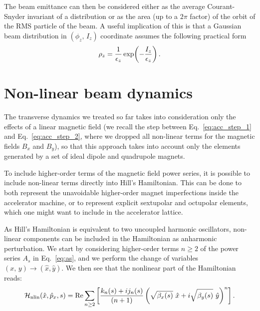 The beam emittance can then be considered either as the average Courant-Snyder invariant of a distribution or as the area (up to a $2\pi$ factor) of the orbit of the RMS particle of the beam. A useful implication of this is that a Gaussian beam distribution in $(\phi_z,\,I_z)$ coordinate assumes the following practical form
%
\begin{equation}
\rho_z = \frac{1}{\epsilon_z}\exp(-\frac{I_z}{\epsilon_z})\,.
\end{equation}
%

\section{Non-linear beam dynamics}\label{sec:non-linear}

The transverse dynamics we treated so far takes into consideration only the effects of a linear magnetic field (we recall the step between Eq.~\eqref{eq:acc_step_1} and Eq.~\eqref{eq:acc_step_2}, where we dropped all non-linear terms for the magnetic fields $B_x$ and $B_y$), so that this approach takes into account only the elements generated by a set of ideal dipole and quadrupole magnets.

To include higher-order terms of the magnetic field power series, it is possible to include non-linear terms directly into Hill's Hamiltonian. This can be done to both represent the unavoidable higher-order magnet imperfections inside the accelerator machine, or to represent explicit sextupolar and octupolar elements, which one might want to include in the accelerator lattice. 

As Hill's Hamiltonian is equivalent to two uncoupled harmonic oscillators, non-linear components can be included in the Hamiltonian as anharmonic perturbation. We start by considering higher-order terms $n \ge 2$ of the power series $A_s$ in Eq.~\eqref{eq:as}, and we perform the change of variables $(x,\,y) \to (\hat x, \hat y)$. We then see that the nonlinear part of the Hamiltonian reads:
%
\begin{equation}
    \mathcal{H}_\text{nlin}(\hat x, \hat p_x, s) = \Re \sum_{n\ge 2} \qty[\frac{k_n(s) + ij_n(s)}{(n+1)} \left(\sqrt{\beta_x(s)}\ \hat x + i\sqrt{\beta_y(s)}\ \hat y\right)^n]\,.
\end{equation}  

